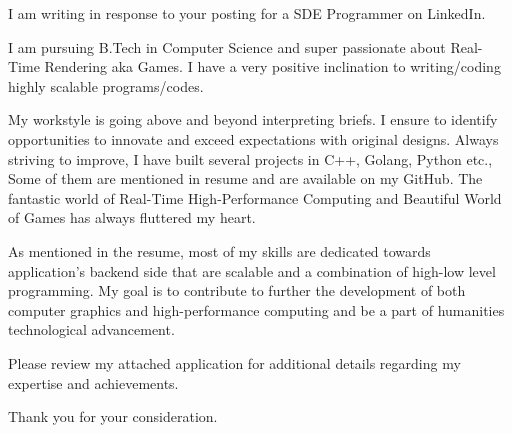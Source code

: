 I am writing in response to your posting for a SDE Programmer on LinkedIn.

I am pursuing B.Tech in Computer Science and super passionate about Real-Time Rendering aka Games. I have a very positive inclination to writing/coding highly scalable programs/codes.

My workstyle is going above and beyond interpreting briefs. I ensure to identify opportunities to innovate and exceed expectations with original designs. Always striving to improve, I have built several projects in C++, Golang, Python etc., Some of them are mentioned in resume and are available on my GitHub. The fantastic world of Real-Time High-Performance Computing and Beautiful World of Games has always fluttered my heart. 

As mentioned in the resume, most of my skills are dedicated towards application's backend side that are scalable and a combination of high-low level programming. My goal is to contribute to further the development of both computer graphics and high-performance computing and be a part of humanities technological advancement.

Please review my attached application for additional details regarding my expertise and achievements.

Thank you for your consideration.